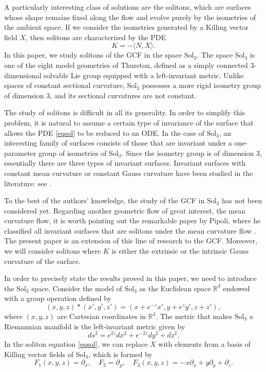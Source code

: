 \documentclass[a4paper,12pt]{amsart}
\theoremstyle{plain}
\theoremstyle{definition}
\def\r{\mathbb R}
\def\sol{\text{Sol}_3}
\begin{document}
A particularly interesting class of solutions are the solitons, which are surfaces whose shape remains fixed along the flow and evolve purely by the isometries of the ambient space. If we consider the isometries generated by a Killing vector field $X$, then solitons are characterized by the PDE 
\begin{equation}\label{eqsol}
K = -\langle N,X\rangle.
\end{equation}
In this paper, we study solitons of the GCF in the space $\sol$. The space $\sol$ is one of the eight model geometries of Thurston, defined as a simply connected 
3-dimensional solvable Lie group equipped with a left-invariant metric. Unlike spaces of constant sectional curvature, $\sol$ possesses a more rigid isometry group of dimension 3, and its sectional curvatures are not constant. 




The study of solitons is difficult in all its generality. In order to simplify this problem, it is natural to assume a certain type of invariance of the surface that allows the PDE \eqref{eqsol} to be reduced to an ODE. In the case of $\sol$, an interesting family of surfaces consists of those that are invariant under a one-parameter group of isometries of $\sol$. Since the isometry group is of dimension $3$, essentially there are three types of invariant surfaces. Invariant surfaces with constant mean curvature or constant Gauss curvature have been studied in the literature: see \cite{lo1,lo2,lm1,lm2,lm3,vr}.

To the best of the authors' knowledge, the study of the GCF in $\sol$ has not been considered yet. Regarding another geometric flow of great interest, the mean curvature flow, it is worth pointing out the remarkable paper by Pipoli, where he classified all invariant surfaces that are solitons under the mean curvature flow \cite{pi}. The present paper is an extension of this line of research to the GCF. Moreover, we will consider solitons where $K$ is either the extrinsic or the intrinsic Gauss curvature of the surface. 

In order to precisely state the results proved in this paper, we need to introduce the $\sol$ space. Consider the model of $\sol$ as the Euclidean space $\r^3$ endowed with a group operation 
 defined by
 $$(x, y, z) \ast (x', y', z') = (x + e^{-z}x', y + e^z y', z + z'),$$
 where $(x,y,z)$ are Cartesian coordinates in $\r^3$. The metric that makes $\sol$ a Riemannian manifold is the left-invariant metric given by
 $$ds^2 = e^{2z}dx^2 + e^{-2z}dy^2 + dz^2.$$
In the soliton equation \eqref{eqsol}, we can replace $X$ with elements from a basis of Killing vector fields of $\sol$, which is formed by 
$$F_1(x,y,z)=\partial_x,\quad F_2=\partial_y,\quad F_3(x,y,z)=-x\partial_x+y\partial_y+\partial_z.$$
\end{document}
